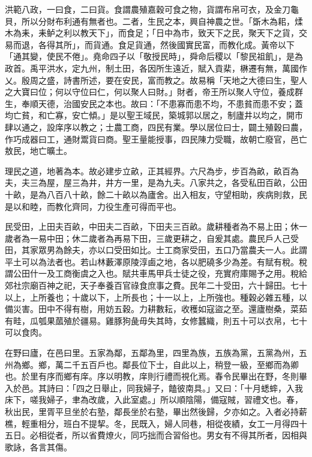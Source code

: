 
\begin{pinyinscope}
洪範八政，一曰食，二曰貨。食謂農殖嘉穀可食之物，貨謂布帛可衣，及金刀龜貝，所以分財布利通有無者也。二者，生民之本，興自神農之世。「斲木為耜，煣木為耒，耒鲈之利以教天下」，而食足；「日中為市，致天下之民，聚天下之貨，交易而退，各得其所」，而貨通。食足貨通，然後國實民富，而教化成。黃帝以下「通其變，使民不倦」。堯命四子以「敬授民時」，舜命后稷以「黎民祖飢」，是為政首。禹平洪水，定九州，制土田，各因所生遠近，賦入貢棐，楙遷有無，萬國作乂。殷周之盛，詩書所述，要在安民，富而教之。故易稱「天地之大德曰生，聖人之大寶曰位；何以守位曰仁，何以聚人曰財。」財者，帝王所以聚人守位，養成群生，奉順天德，治國安民之本也。故曰：「不患寡而患不均，不患貧而患不安；蓋均亡貧，和亡寡，安亡傾。」是以聖王域民，築城郭以居之，制廬井以均之，開市肆以通之，設庠序以教之；士農工商，四民有業。學以居位曰士，闢土殖穀曰農，作巧成器曰工，通財鬻貨曰商。聖王量能授事，四民陳力受職，故朝亡廢官，邑亡敖民，地亡曠土。

理民之道，地著為本。故必建步立畝，正其經界。六尺為步，步百為畝，畝百為夫，夫三為屋，屋三為井，井方一里，是為九夫。八家共之，各受私田百畝，公田十畝，是為八百八十畝，餘二十畝以為廬舍。出入相友，守望相助，疾病則救，民是以和睦，而教化齊同，力役生產可得而平也。

民受田，上田夫百畝，中田夫二百畝，下田夫三百畝。歲耕種者為不易上田；休一歲者為一易中田；休二歲者為再易下田，三歲更耕之，自爰其處。農民戶人己受田，其家眾男為餘夫，亦以口受田如比。士工商家受田，五口乃當農夫一人。此謂平土可以為法者也。若山林藪澤原陵淳鹵之地，各以肥磽多少為差。有賦有稅。稅謂公田什一及工商衡虞之入也。賦共車馬甲兵士徒之役，充實府庫賜予之用。稅給郊社宗廟百神之祀，天子奉養百官祿食庶事之費。民年二十受田，六十歸田。七十以上，上所養也；十歲以下，上所長也；十一以上，上所強也。種穀必雜五種，以備災害。田中不得有樹，用妨五穀。力耕數耘，收穫如寇盜之至。還廬樹桑，菜茹有畦，瓜瓠果蓏殖於疆易。雞豚狗彘毋失其時，女修蠶織，則五十可以衣帛，七十可以食肉。

在野曰廬，在邑曰里。五家為鄰，五鄰為里，四里為族，五族為黨，五黨為州，五州為鄉。鄉，萬二千五百戶也。鄰長位下士，自此以上，稍登一級，至鄉而為卿也。於里有序而鄉有庠。序以明教，庠則行禮而視化焉。春令民畢出在野，冬則畢入於邑。其詩曰：「四之日舉止，同我婦子，饁彼南具。」又曰：「十月蟋蟀，入我床下，嗟我婦子，聿為改歲，入此室處。」所以順陰陽，備寇賊，習禮文也。春，秋出民，里胥平旦坐於右塾，鄰長坐於右塾，畢出然後歸，夕亦如之。入者必持薪樵，輕重相分，班白不提挈。冬，民既入，婦人同巷，相從夜績，女工一月得四十五日。必相從者，所以省費燎火，同巧拙而合習俗也。男女有不得其所者，因相與歌詠，各言其傷。


\end{pinyinscope}

